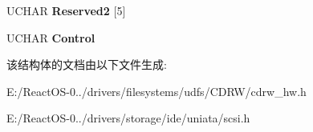 \begin{DoxyCompactItemize}
\begin{tabbing}
\end{tabbing}\item 
\mbox{\label{struct___c_d_b_1_1___s_e_t___c_d___s_p_e_e_d_a60da4ac5a0adb6ecc1c2cc24bbb999e0}} 
U\+C\+H\+AR {\bfseries Reserved2} \mbox{[}5\mbox{]}
\item 
\mbox{\label{struct___c_d_b_1_1___s_e_t___c_d___s_p_e_e_d_a2679b0b118dee02877be3e4181940bb0}} 
U\+C\+H\+AR {\bfseries Control}
\end{DoxyCompactItemize}


该结构体的文档由以下文件生成\+:\begin{DoxyCompactItemize}
\item 
E\+:/\+React\+O\+S-\/0../drivers/filesystems/udfs/\+C\+D\+R\+W/cdrw\+\_\+hw.\+h\item 
E\+:/\+React\+O\+S-\/0../drivers/storage/ide/uniata/scsi.\+h\end{DoxyCompactItemize}
